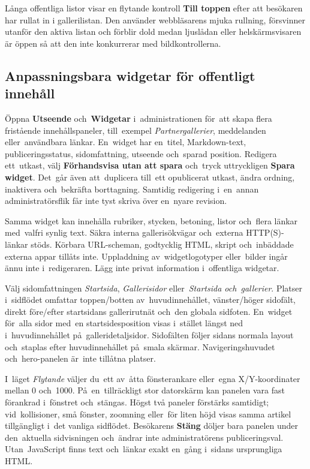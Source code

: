 \documentclass[11pt,a4paper]{article}
\newcommand{\ui}[1]{\textbf{#1}}
\begin{document}
Långa offentliga listor visar en flytande kontroll \ui{Till toppen} efter att
besökaren har rullat in i gallerilistan. Den använder webbläsarens mjuka
rullning, försvinner utanför den aktiva listan och förblir dold medan ljuslådan
eller helskärmsvisaren är öppen så att den inte konkurrerar med
bildkontrollerna.

\subsection{Anpassningsbara widgetar för offentligt innehåll}

Öppna \ui{Utseende} och~\ui{Widgetar} i~administrationen för~att skapa flera
fristående innehållspaneler, till~exempel \emph{Partnergallerier}, meddelanden
eller~användbara länkar. En~widget har en~titel, Markdown-text,
publiceringsstatus, sidomfattning, utseende och~sparad position. Redigera
ett~utkast, välj \ui{Förhandsvisa utan att spara} och~tryck uttryckligen
\ui{Spara widget}. Det~går även att~duplicera till~ett opublicerat utkast, ändra
ordning, inaktivera och~bekräfta borttagning. Samtidig redigering i~en~annan
administratörsflik får inte tyst skriva över en~nyare revision.

Samma widget kan innehålla rubriker, stycken, betoning, listor och~flera länkar
med~valfri synlig text. Säkra interna gallerisökvägar och~externa HTTP(S)-länkar
stöds. Körbara URL-scheman, godtycklig HTML, skript och~inbäddade externa appar
tillåts inte. Uppladdning av~widgetlogotyper eller~bilder ingår ännu inte
i~redigeraren. Lägg inte privat information i~offentliga widgetar.

Välj sidomfattningen \emph{Startsida}, \emph{Gallerisidor} eller~\emph{Startsida
och~gallerier}. Platser i~sidflödet omfattar toppen/botten av~huvudinnehållet,
vänster/höger sidofält, direkt före/efter startsidans gallerirutnät och~den
globala sidfoten. En~widget för~alla sidor med~en startsidesposition visas
i~stället längst ned i~huvudinnehållet på~galleridetaljsidor. Sidofälten följer
sidans normala layout och~staplas efter huvudinnehållet på~smala skärmar.
Navigeringshuvudet och~hero-panelen är~inte tillåtna platser.

I~läget \emph{Flytande} väljer du~ett av~åtta fönsterankare eller~egna
X/Y-koordinater mellan 0 och~1000. På~en~tillräckligt stor datorskärm kan
panelen vara fast förankrad i~fönstret och~stängas. Högst två paneler förstärks
samtidigt; vid~kollisioner, små fönster, zoomning eller~för liten höjd visas
samma artikel tillgängligt i~det vanliga sidflödet. Besökarens \ui{Stäng} döljer
bara panelen under den~aktuella sidvisningen och~ändrar inte administratörens
publiceringsval. Utan~JavaScript finns text och~länkar exakt en~gång i~sidans
ursprungliga HTML.
\end{document}
